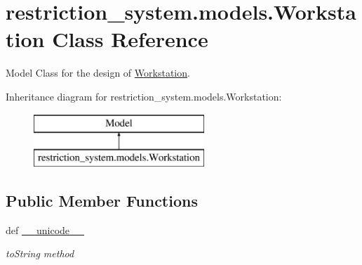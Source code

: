 \hypertarget{classrestriction__system_1_1models_1_1Workstation}{}\section{restriction\+\_\+system.\+models.\+Workstation Class Reference}
\label{classrestriction__system_1_1models_1_1Workstation}


Model Class for the design of \hyperlink{classrestriction__system_1_1models_1_1Workstation}{Workstation}.  


Inheritance diagram for restriction\+\_\+system.\+models.\+Workstation\+:\begin{figure}[H]
\begin{center}
\leavevmode
\includegraphics[height=2.000000cm]{classrestriction__system_1_1models_1_1Workstation}
\end{center}
\end{figure}
\subsection*{Public Member Functions}
\begin{DoxyCompactItemize}
\item 
def \hyperlink{classrestriction__system_1_1models_1_1Workstation_ad1e40c07bcaefcc66f464f5c6de9d2f5}{\+\_\+\+\_\+unicode\+\_\+\+\_\+}
\begin{DoxyCompactList}\small\item\em to\+String method \end{DoxyCompactList}\end{DoxyCompactItemize}
